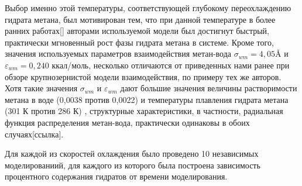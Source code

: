 Выбор именно этой температуры, соответствующей глубокому переохлаждению гидрата метана, был мотивирован тем, что при данной температуре в более ранних работах[] авторами используемой модели был достигнут быстрый, практически мгновенный рост фазы гидрата метана в системе. Кроме того, значения используемых параметров взаимодействия метан-вода $\sigma_{wm}=4,05 \si{\angstrom}$ и $\varepsilon_{wm}=0,240$ ккал/моль, несколько отличаются от приведенных нами ранее при обзоре крупнозернистой модели взаимодействия, по примеру тех же авторов. Хотя такие значения $\sigma_{wm}$ и $\varepsilon_{wm}$ дают большие значения величины растворимости метана в воде (0,0038 против 0,0022) и температуры плавления гидрата метана (301 К против 286 К) , структурные характеристики, в частности, радиальная функция распределения метан-вода, практически одинаковы в обоих случаях[ссылка].

Для каждой из скоростей охлаждения было проведено 10 независимых моделированиий, для каждого из которого была построена зависимость процентного содержания гидратов от времени моделирования.